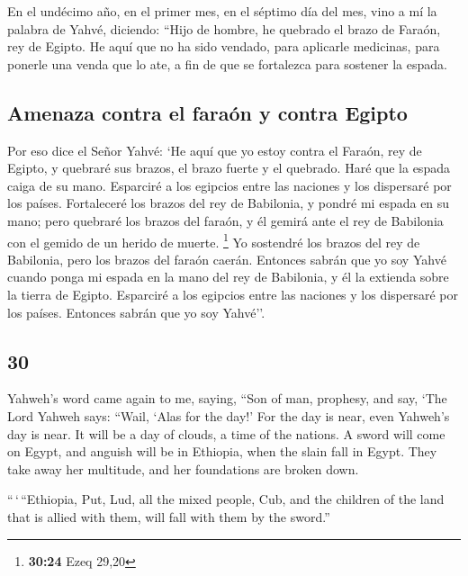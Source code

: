 \begin{paracol}{2}
 En el undécimo año, en el primer mes, en el séptimo día
del mes, vino a mí la palabra de Yahvé, diciendo:  ``Hijo
de hombre, he quebrado el brazo de Faraón, rey de Egipto. He aquí que no
ha sido vendado, para aplicarle medicinas, para ponerle una venda que lo
ate, a fin de que se fortalezca para sostener la espada.

\hypertarget{amenaza-contra-el-farauxf3n-y-contra-egipto}{%
\subsection{Amenaza contra el faraón y contra
Egipto}\label{amenaza-contra-el-farauxf3n-y-contra-egipto}}

 Por eso dice el Señor Yahvé: `He aquí que yo estoy
contra el Faraón, rey de Egipto, y quebraré sus brazos, el brazo fuerte
y el quebrado. Haré que la espada caiga de su mano. 
Esparciré a los egipcios entre las naciones y los dispersaré por los
países.  Fortaleceré los brazos del rey de Babilonia, y
pondré mi espada en su mano; pero quebraré los brazos del faraón, y él
gemirá ante el rey de Babilonia con el gemido de un herido de muerte.
\footnote{\textbf{30:24} Ezeq 29,20}  Yo sostendré los
brazos del rey de Babilonia, pero los brazos del faraón caerán. Entonces
sabrán que yo soy Yahvé cuando ponga mi espada en la mano del rey de
Babilonia, y él la extienda sobre la tierra de Egipto. 
Esparciré a los egipcios entre las naciones y los dispersaré por los
países. Entonces sabrán que yo soy Yahvé''.

\switchcolumn
\begin{otherlanguage}{english}

\hypertarget{section-59}{%
\section{30}\label{section-59}}

 Yahweh's word came again to me, saying, 
``Son of man, prophesy, and say, `The Lord Yahweh says: ``Wail, `Alas
for the day!'  For the day is near, even Yahweh's day is
near. It will be a day of clouds, a time of the nations. 
A sword will come on Egypt, and anguish will be in Ethiopia, when the
slain fall in Egypt. They take away her multitude, and her foundations
are broken down.

 ``\,`\,``Ethiopia, Put, Lud, all the mixed people, Cub,
and the children of the land that is allied with them, will fall with
them by the sword.''


\end{otherlanguage}
\end{paracol}
